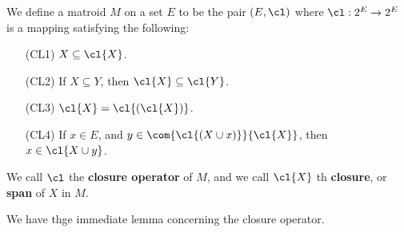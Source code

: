 \begin{definition}
    We define a matroid $M$ on a set  $E$ to be the pair  $(E,\cl)$ where
    $\cl:2^E \rightarrow 2^E$ is a mapping satisfying the following:
    \begin{enumerate}
        \item[(CL1)] $X \subseteq \cl{X}$.

        \item[(CL2)] If $X \subseteq Y$, then  $\cl{X} \subseteq \cl{Y}$.

        \item[(CL3)] $\cl{X}=\cl{(\cl{X})}$.

        \item[(CL4)] If $x \in E$, and  $y \in \com{\cl{(X \cup x)}}{\cl{X}}$,
            then $x \in \cl{X \cup y}$.
    \end{enumerate}
    We call $\cl$ the \textbf{closure operator} of  $M$, and we call  $\cl{X}$
    th \textbf{closure}, or \textbf{span} of $X$ in  $M$.
\end{definition}

We have thge immediate lemma concerning the closure operator.

